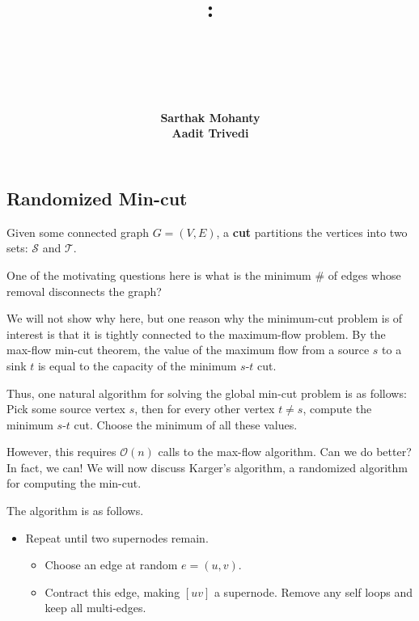 \documentclass[14pt]{extreport}
\title{
    \vspace{1.75in}
    \textbf{\lectClass:\\ \lectTitle}\\
    \vspace{0.1in}\large{\textit{\lectClassInstructor\ \lectSection}}
    \vspace{2in}
    \author{\textbf{Sarthak Mohanty} \\ \textbf{Aadit Trivedi}}
    \date{}
}
\begin{document}
\maketitle
\pagebreak

\subsection*{Randomized Min-cut}
    Given some connected graph $G = (V, E)$, a \textbf{cut} partitions the vertices into two sets: $\mathcal{S}$ and $\mathcal{T}$.

    \vspace{4mm}

    One of the motivating questions here is what is the minimum \# of edges whose removal disconnects the graph?

    \vspace{4mm}

    We will not show why here, but one reason why the minimum-cut problem is of interest is that it is tightly connected to the maximum-flow problem. By the max-flow min-cut theorem, the value of the maximum flow from a source $s$ to a sink $t$ is equal to the capacity of the minimum $s$-$t$ cut.

    \vspace{4mm}

    Thus, one natural algorithm for solving the global min-cut problem is as follows: Pick some source vertex $s$, then for every other vertex $t \ne s$, compute the minimum $s$-$t$ cut. Choose the minimum of all these values.

    \vspace{4mm}

    However, this requires $\mathcal{O}(n)$ calls to the max-flow algorithm. Can we do better? In fact, we can! We will now discuss Karger's algorithm, a randomized algorithm for computing the min-cut.

    \vspace{4mm}

    The algorithm is as follows.
    \begin{itemize}
        \item Repeat until two supernodes remain.
        \begin{itemize}
            \item Choose an edge at random $e = (u,v)$.
            \item Contract this edge, making $[uv]$ a supernode. Remove any self loops and keep all multi-edges.
        \end{itemize}
    \end{itemize}
\end{document}
